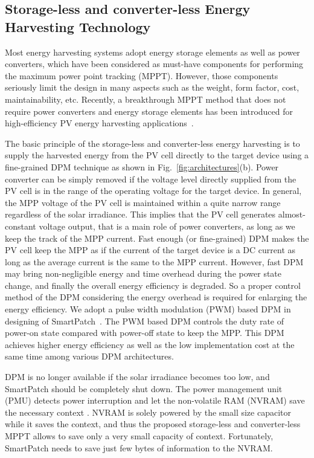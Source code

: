 \documentclass[journal]{IEEEtran}
\begin{document}
\subsection{Storage-less and converter-less Energy Harvesting Technology}
Most energy harvesting systems adopt energy storage elements as well as power converters, which have been considered as must-have components for performing the maximum power point tracking (MPPT). However, those components seriously limit the design in many aspects such as the weight, form factor, cost, maintainability, etc. Recently, a breakthrough MPPT method that does not require power converters and energy storage elements has been introduced for high-efficiency PV energy harvesting applications~\cite{Wang:ASPDAC14}.

The basic principle of the storage-less and converter-less energy harvesting is to supply the harvested energy from the PV cell directly to the target device using a fine-grained DPM technique as shown in Fig.~\ref{fig:architectures}(b). Power converter can be simply removed if the voltage level directly supplied from the PV cell is in the range of the operating voltage for the target device. In general, the MPP voltage of the PV cell is maintained within a quite narrow range regardless of the solar irradiance.
This implies that the PV cell generates almost-constant voltage output, that is a main role of power converters, as long as we keep the track of the MPP current. Fast enough (or fine-grained) DPM makes the PV cell keep the MPP as if the current of the target device is a DC current as long as the average current is the same to the MPP current. However, fast DPM may bring non-negligible energy and time overhead during the power state change, and finally the overall energy efficiency is degraded. So a proper control method of the DPM considering the energy overhead is required for enlarging the energy efficiency. We adopt a pulse width modulation (PWM) based DPM in designing of SmartPatch~\cite{Lee:ASPDAC15}. The PWM based DPM controls the duty rate of power-on state compared with power-off state to keep the MPP. This DPM achieves higher energy efficiency as well as the low implementation cost at the same time among various DPM architectures.

DPM is no longer available if the solar irradiance becomes too low, and SmartPatch should be completely shut down. The power management unit (PMU) detects power interruption and let the non-volatile RAM (NVRAM) save the necessary context \cite{Balsamo:TCAD16}. NVRAM is solely powered by the small size capacitor while it saves the context, and thus the proposed storage-less and converter-less MPPT allows to save only a very small capacity of context. Fortunately, SmartPatch needs to save just few bytes of information to the NVRAM.
\end{document}

